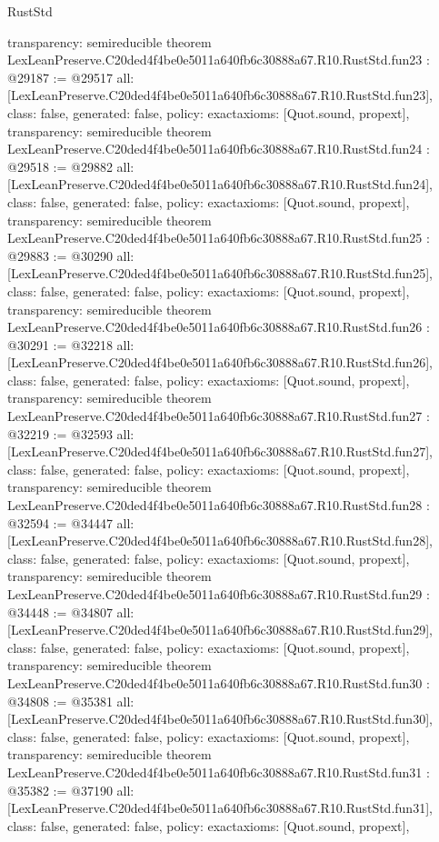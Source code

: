 \begin{lexlean}{RustStd}
\begin{coremodule}
{  transparency: semireducible
}
theorem LexLeanPreserve.C20ded4f4be0e5011a640fb6c30888a67.R10.RustStd.fun23 : @29187 := @29517 {
  all: [LexLeanPreserve.C20ded4f4be0e5011a640fb6c30888a67.R10.RustStd.fun23],
  class: false,
  generated: false,
  policy: exact{axioms: [Quot.sound, propext]},
  transparency: semireducible
}
theorem LexLeanPreserve.C20ded4f4be0e5011a640fb6c30888a67.R10.RustStd.fun24 : @29518 := @29882 {
  all: [LexLeanPreserve.C20ded4f4be0e5011a640fb6c30888a67.R10.RustStd.fun24],
  class: false,
  generated: false,
  policy: exact{axioms: [Quot.sound, propext]},
  transparency: semireducible
}
theorem LexLeanPreserve.C20ded4f4be0e5011a640fb6c30888a67.R10.RustStd.fun25 : @29883 := @30290 {
  all: [LexLeanPreserve.C20ded4f4be0e5011a640fb6c30888a67.R10.RustStd.fun25],
  class: false,
  generated: false,
  policy: exact{axioms: [Quot.sound, propext]},
  transparency: semireducible
}
theorem LexLeanPreserve.C20ded4f4be0e5011a640fb6c30888a67.R10.RustStd.fun26 : @30291 := @32218 {
  all: [LexLeanPreserve.C20ded4f4be0e5011a640fb6c30888a67.R10.RustStd.fun26],
  class: false,
  generated: false,
  policy: exact{axioms: [Quot.sound, propext]},
  transparency: semireducible
}
theorem LexLeanPreserve.C20ded4f4be0e5011a640fb6c30888a67.R10.RustStd.fun27 : @32219 := @32593 {
  all: [LexLeanPreserve.C20ded4f4be0e5011a640fb6c30888a67.R10.RustStd.fun27],
  class: false,
  generated: false,
  policy: exact{axioms: [Quot.sound, propext]},
  transparency: semireducible
}
theorem LexLeanPreserve.C20ded4f4be0e5011a640fb6c30888a67.R10.RustStd.fun28 : @32594 := @34447 {
  all: [LexLeanPreserve.C20ded4f4be0e5011a640fb6c30888a67.R10.RustStd.fun28],
  class: false,
  generated: false,
  policy: exact{axioms: [Quot.sound, propext]},
  transparency: semireducible
}
theorem LexLeanPreserve.C20ded4f4be0e5011a640fb6c30888a67.R10.RustStd.fun29 : @34448 := @34807 {
  all: [LexLeanPreserve.C20ded4f4be0e5011a640fb6c30888a67.R10.RustStd.fun29],
  class: false,
  generated: false,
  policy: exact{axioms: [Quot.sound, propext]},
  transparency: semireducible
}
theorem LexLeanPreserve.C20ded4f4be0e5011a640fb6c30888a67.R10.RustStd.fun30 : @34808 := @35381 {
  all: [LexLeanPreserve.C20ded4f4be0e5011a640fb6c30888a67.R10.RustStd.fun30],
  class: false,
  generated: false,
  policy: exact{axioms: [Quot.sound, propext]},
  transparency: semireducible
}
theorem LexLeanPreserve.C20ded4f4be0e5011a640fb6c30888a67.R10.RustStd.fun31 : @35382 := @37190 {
  all: [LexLeanPreserve.C20ded4f4be0e5011a640fb6c30888a67.R10.RustStd.fun31],
  class: false,
  generated: false,
  policy: exact{axioms: [Quot.sound, propext]},
}
\end{coremodule}
\end{lexlean}

